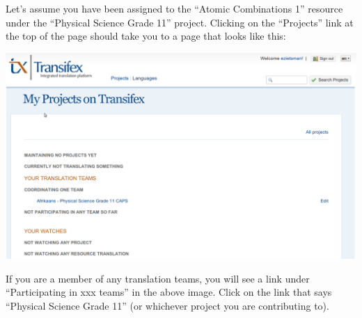 \documentclass[10pt, a4paper]{article}
\begin{document}
Let's assume you have been assigned to the ``Atomic Combinations 1'' resource under the ``Physical Science Grade 11'' project. Clicking on the ``Projects'' link at the top of the page should take you to a page that looks like this:
\begin{center}
    \centerline{\includegraphics[width=0.8\paperwidth]{images/selectproject.png}}
\end{center}
If you are a member of any translation teams, you will see a link under ``Participating in xxx teams'' in the above image. Click on the link that says ``Physical Science Grade 11'' (or whichever project you are contributing to).
\end{document}

